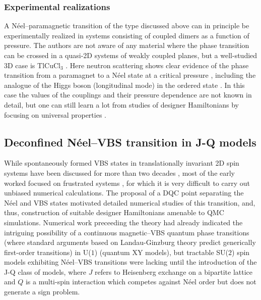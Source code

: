 \documentclass[range]{ar2e}
\begin{document}
\subsubsection{Experimental realizations}
A N\'eel--paramagnetic transition of the type discussed above can in principle be experimentally realized in systems consisting of coupled dimers as a function 
of pressure. The authors are not aware of any material where the phase transition can be crossed in a quasi-2D systems of weakly 
coupled planes, but a well-studied 3D case is TlCuCl$_3$ \cite{Cavadini01,Ruegg04}. Here neutron scattering shows clear evidence of the phase transition 
from a paramagnet to a N\'eel state at a critical pressure \cite{Ruegg08}, including the analogue of the Higgs boson (longitudinal mode) in the ordered 
state \cite{Sachdev09}. In this case the values of the couplings and their pressure dependence are not known in detail, but one can still learn a lot from 
studies of designer Hamiltonians by focusing on universal properties \cite{Troyer97,Yao07,Jin12,Oitmaa11}.


\subsection{Deconfined N\'eel--VBS transition in J-Q models}
\label{ss:jq2}
While spontaneously formed VBS states in translationally invariant 2D spin systems have been discussed for more than two decades \cite{Chandra88,Dagotto89,Read89},
most of the early worked focused on frustrated systems \cite{Dagotto89,Schulz96,Capriotti01}, for which it is very difficult to carry out unbiased numerical 
calculations. The proposal of a DQC point separating the N\'eel and VBS states motivated detailed numerical studies of this transition, and, thus, construction 
of suitable designer 
Hamiltonians amenable to QMC simulations. Numerical work preceeding the theory \cite{Sandvik02} had already indicated the intriguing possibility of 
a continuous magnetic--VBS quantum phase transitions (where standard arguments based on Landau-Ginzburg theory predict generically first-order transitions) in
U($1$) (quantum XY models), but tractable SU($2$) spin models exhibiting N\'eel--VBS transitions were lacking until the introduction of the J-Q class of models, 
where $J$ refers to Heisenberg exchange on a bipartite lattice and $Q$ is a multi-spin interaction which competes against N\'eel order but does not generate 
a sign problem. 
\end{document}
